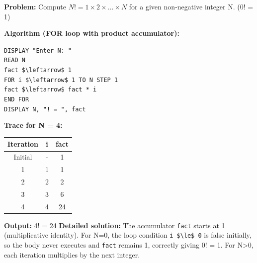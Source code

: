 \documentclass[11pt]{article}
\begin{document}
\begin{exoresolu}[Factorial of N (N!)]
\textbf{Problem:} Compute $N! = 1 \times 2 \times \dots \times N$ for a given non‑negative integer N. (0! = 1)

\textbf{Algorithm (FOR loop with product accumulator):}
\begin{flushleft}
\texttt{DISPLAY "Enter N: "}\\
\texttt{READ N}\\
\texttt{fact \$\textbackslash{}leftarrow\$ 1}\\
\texttt{FOR i \$\textbackslash{}leftarrow\$ 1 TO N STEP 1}\\
\quad\texttt{fact \$\textbackslash{}leftarrow\$ fact * i}\\
\texttt{END FOR}\\
\texttt{DISPLAY N, "! = ", fact}
\end{flushleft}

\textbf{Trace for N = 4:}
\begin{center}
\begin{tabular}{|c|c|c|}
\hline
\rowcolor{popblueL}
\textbf{Iteration} & \textbf{i} & \textbf{fact} \\
\hline
Initial & - & 1 \\
1 & 1 & 1 \\
2 & 2 & 2 \\
3 & 3 & 6 \\
4 & 4 & 24 \\
\hline
\end{tabular}
\end{center}
\textbf{Output:} 4! = 24
\tcblower
\textbf{Detailed solution:} The accumulator \texttt{fact} starts at 1 (multiplicative identity). For N=0, the loop condition \texttt{i \$\textbackslash{}le\$ 0} is false initially, so the body never executes and \texttt{fact} remains 1, correctly giving 0! = 1. For N>0, each iteration multiplies by the next integer.
\end{exoresolu}
\end{document}
